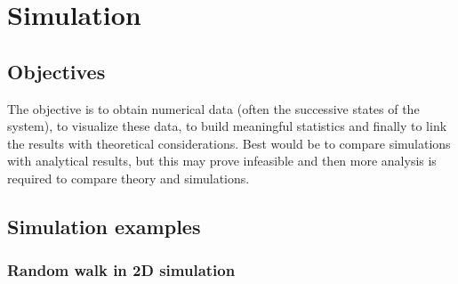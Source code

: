 \thispagestyle{empty}
\chapter{Simulation}
\label{simulation.chap}

\section{Objectives}
The objective is to obtain numerical data (often the successive states of the system), to visualize these data, to build meaningful statistics and finally to link the results with theoretical considerations. Best would be to compare simulations with analytical results, but this may prove infeasible and then more analysis is required to compare theory and simulations.

\section{Simulation examples}
% 

% 

% 

\subsection{Random walk in 2D simulation}
